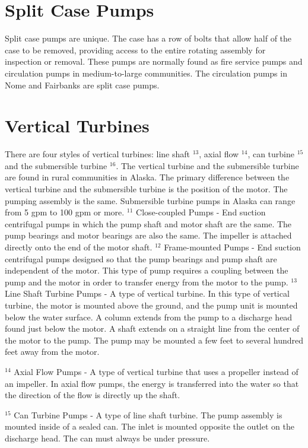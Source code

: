 \documentclass[10pt]{article}
\begin{document}
\section{Split Case Pumps}
Split case pumps are unique. The case has a row of bolts that allow half of the case to be removed, providing access to the entire rotating assembly for inspection or removal. These pumps are normally found as fire service pumps and circulation pumps in medium-to-large communities. The circulation pumps in Nome and Fairbanks are split case pumps.

\section{Vertical Turbines}
There are four styles of vertical turbines: line shaft ${ }^{13}$, axial flow $^{14}$, can turbine ${ }^{15}$ and the submersible turbine ${ }^{16}$. The vertical turbine and the submersible turbine are found in rural communities in Alaska. The primary difference between the vertical turbine and the submersible turbine is the position of the motor. The pumping assembly is the same. Submersible turbine pumps in Alaska can range from 5 gpm to 100 gpm or more. ${ }^{11}$ Close-coupled Pumps - End suction centrifugal pumps in which the pump shaft and motor shaft are the same. The pump bearings and motor bearings are also the same. The impeller is attached directly onto the end of the motor shaft. ${ }^{12}$ Frame-mounted Pumps - End suction centrifugal pumps designed so that the pump bearings and pump shaft are independent of the motor. This type of pump requires a coupling between the pump and the motor in order to transfer energy from the motor to the pump. ${ }^{13}$ Line Shaft Turbine Pumps - A type of vertical turbine. In this type of vertical turbine, the motor is mounted above the ground, and the pump unit is mounted below the water surface. A column extends from the pump to a discharge head found just below the motor. A shaft extends on a straight line from the center of the motor to the pump. The pump may be mounted a few feet to several hundred feet away from the motor.

${ }^{14}$ Axial Flow Pumps - A type of vertical turbine that uses a propeller instead of an impeller. In axial flow pumps, the energy is transferred into the water so that the direction of the flow is directly up the shaft.

${ }^{15}$ Can Turbine Pumps - A type of line shaft turbine. The pump assembly is mounted inside of a sealed can. The inlet is mounted opposite the outlet on the discharge head. The can must always be under pressure.
\end{document}
